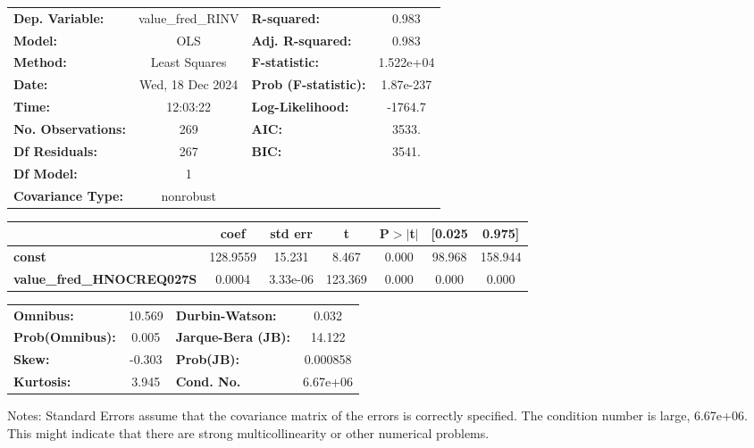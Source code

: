 \begin{center}
\begin{tabular}{lclc}
\toprule
\textbf{Dep. Variable:}           & value\_fred\_RINV & \textbf{  R-squared:         } &     0.983   \\
\textbf{Model:}                   &        OLS        & \textbf{  Adj. R-squared:    } &     0.983   \\
\textbf{Method:}                  &   Least Squares   & \textbf{  F-statistic:       } & 1.522e+04   \\
\textbf{Date:}                    &  Wed, 18 Dec 2024 & \textbf{  Prob (F-statistic):} & 1.87e-237   \\
\textbf{Time:}                    &      12:03:22     & \textbf{  Log-Likelihood:    } &   -1764.7   \\
\textbf{No. Observations:}        &          269      & \textbf{  AIC:               } &     3533.   \\
\textbf{Df Residuals:}            &          267      & \textbf{  BIC:               } &     3541.   \\
\textbf{Df Model:}                &            1      & \textbf{                     } &             \\
\textbf{Covariance Type:}         &     nonrobust     & \textbf{                     } &             \\
\bottomrule
\end{tabular}
\begin{tabular}{lcccccc}
                                  & \textbf{coef} & \textbf{std err} & \textbf{t} & \textbf{P$> |$t$|$} & \textbf{[0.025} & \textbf{0.975]}  \\
\midrule
\textbf{const}                    &     128.9559  &       15.231     &     8.467  &         0.000        &       98.968    &      158.944     \\
\textbf{value\_fred\_HNOCREQ027S} &       0.0004  &     3.33e-06     &   123.369  &         0.000        &        0.000    &        0.000     \\
\bottomrule
\end{tabular}
\begin{tabular}{lclc}
\textbf{Omnibus:}       & 10.569 & \textbf{  Durbin-Watson:     } &    0.032  \\
\textbf{Prob(Omnibus):} &  0.005 & \textbf{  Jarque-Bera (JB):  } &   14.122  \\
\textbf{Skew:}          & -0.303 & \textbf{  Prob(JB):          } & 0.000858  \\
\textbf{Kurtosis:}      &  3.945 & \textbf{  Cond. No.          } & 6.67e+06  \\
\bottomrule
\end{tabular}
\end{center}

Notes: \newline
 [1] Standard Errors assume that the covariance matrix of the errors is correctly specified. \newline
 [2] The condition number is large, 6.67e+06. This might indicate that there are \newline
 strong multicollinearity or other numerical problems.